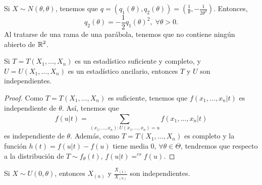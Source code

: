 \begin{eg}
Si $\displaystyle X \sim N\left(\theta, \theta\right) $, tenemos que $\displaystyle q = \left(q_{1}\left(\theta\right), q_{2}\left(\theta\right)\right)=\left(\frac{1}{\theta}, -\frac{1}{2\theta^{2}}\right) $. Entonces,
\[q_{2}\left(\theta\right)=-\frac{1}{2}q_{1}\left(\theta\right)^{2}, \; \forall \theta > 0 .\]
Al tratarse de una rama de una parábola, tenemos que no contiene ningún abierto de $\displaystyle \mathbb{R}^{2} $. 
\end{eg}
\begin{theorem}
Si $\displaystyle T = T\left(X_{1}, \ldots, X_{n}\right) $ es un estadístico suficiente y completo, y $\displaystyle U = U\left(X_{1}, \ldots, X_{n}\right) $ es un estadístico ancilario, entonces $\displaystyle T $ y $\displaystyle U $ son independientes.
\end{theorem}
\begin{proof}
Como $\displaystyle T = T\left(X_{1}, \ldots, X_{n}\right) $ es suficiente, tenemos que $\displaystyle f\left(x_{1}, \ldots, x_{n}|t\right) $ es independiente de $\displaystyle \theta $. Así, tenemos que
\[f\left(u|t\right)=\sum^{}_{\left(x_{1}, \ldots, x_{n}\right) : U\left(x_{1}, \ldots, x_{n}\right)=u}f\left(x_{1}, \ldots, x_{n} | t\right) \]
es independiente de $\displaystyle \theta $. Además, como $\displaystyle T = T\left(X_{1}, \ldots, X_{n}\right) $ es completo y la función $\displaystyle h\left(t\right)=f\left(u|t\right)-f\left(u\right) $ tiene media $\displaystyle 0 $, $\displaystyle \forall \theta \in \Theta $, tendremos que respecto a la distribución de $\displaystyle T\sim f_{\theta}\left(t\right) $, $\displaystyle f\left(u|t\right)=^{cs}f\left(u\right) $. 
\end{proof}
\begin{eg}
Si $\displaystyle X \sim U\left(0,\theta\right) $, entonces $\displaystyle X_{\left(n\right)} $ y $\displaystyle \frac{X_{\left(1\right)}}{X_{\left(n\right)}} $ son independientes.
\end{eg}
